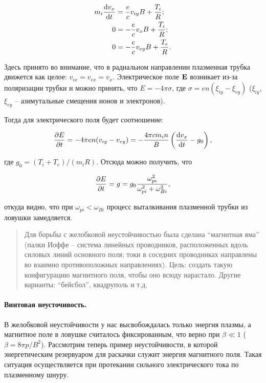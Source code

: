 \documentclass[10pt, a4paper]{article}
\begin{document}
\begin{align*}
	m_i \dv{v_x}{t} &= \frac{e}{c} v_{iy} B + \frac{T_i}{R}; \\
	0 &= -\frac{e}{c} v_{x} B + \frac{T_i}{R}; \\
	0 &= -\frac{e}{c} v_{ey} B + \frac{T_e}{R}.
\end{align*}

Здесь принято во внимание, что в радиальном направлении плазменная трубка движется как целое: $v_{ix}=v_{ex}=v_x$. Электрическое поле $\vb{E}$ возникает из-за поляризации трубки и можно принять, что $E=- 4 \pi \sigma$, где $\sigma=en(\xi_{iy}-\xi_{ey})$ ($\xi_{iy}$, $\xi_{ey}$ -- азимутальные смещения ионов и электронов). 

Тогда для электрического поля будет соотношение:

\begin{equation*}
	\pdv{E}{t} = -4 \pi e n (v_{iy}-v_{ey})=-\frac{4\pi c m_i n}{B}\left(\dv{v_x}{t} - g_0\right) ,
\end{equation*}

где $g_0=(T_i+T_e)/(m_iR)$. Отсюда можно получить, что

\begin{equation*}
	\pdv{E}{t} = g = g_0\frac{\omega_{pi}^2}{\omega_{pi}^2+\omega_{Bi}^2},
\end{equation*}

откуда видно, что при $\omega_{pi}<\omega_{Bi}$ процесс выталкивания плазменной трубки из ловушки замедляется.

\begin{quotation}
	
	Для борьбы с желобковой неустойчивостью была сделана ``магнитная яма'' (палки Иоффе -- система линейных проводников, расположенных вдоль силовых линий основного поля; токи в соседних проводниках направлены во
	взаимно противоположных направлениях). Цель: создать такую конфигурацию магнитного поля, чтобы оно всюду нарастало. Другие варианты: ``бейсбол'', квадруполь и т.д.
	
\end{quotation}

\paragraph{Винтовая неусточивость.}

В желобковой неустойчивости у нас высвобождалась только энергия плазмы, а магнитное поле в ловушке считалось фиксированным, что верно при $\beta \ll 1$ ($\beta=8 \pi p / B^2$). Рассмотрим теперь пример неустойчивости, в которой
энергетическим резервуаром для раскачки служит энергия магнитного поля. Такая ситуация осуществляется при протекании сильного электрического тока по плазменному шнуру.
\end{document}
